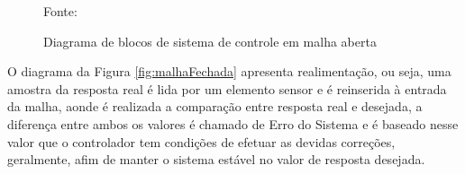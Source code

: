 \begin{figure}[!htb]
\centering
\caption{ Diagrama de blocos de sistema de controle em malha aberta}
\label{fig:malhaAberta}

{\small Fonte: \cite{Ogata}}
\end{figure}

O diagrama da Figura \ref{fig:malhaFechada} apresenta realimentação, ou seja, uma amostra da resposta real é lida por um elemento sensor e é reinserida à entrada da malha, aonde é realizada a comparação entre resposta real e desejada, a diferença entre ambos os valores é chamado de Erro do Sistema e é baseado nesse valor que o controlador tem condições de efetuar as devidas correções, geralmente, afim de manter o sistema estável no valor de resposta desejada.

